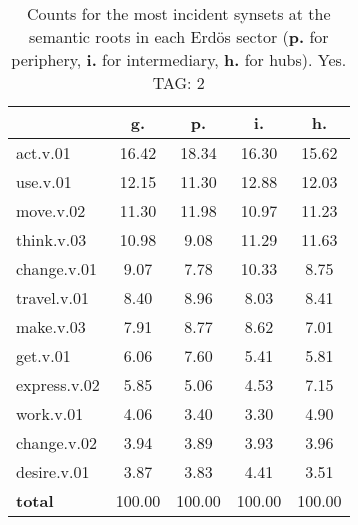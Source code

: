 \begin{table}[h!]
\begin{center}
\begin{tabular}{| l | c | c | c | c |}\hline
 & g. & p. & i. & h. \\\hline
act.v.01 & 16.42  & 18.34  & 16.30  & 15.62 \\\hline
use.v.01 & 12.15  & 11.30  & 12.88  & 12.03 \\\hline
move.v.02 & 11.30  & 11.98  & 10.97  & 11.23 \\\hline
think.v.03 & 10.98  & 9.08  & 11.29  & 11.63 \\\hline
change.v.01 & 9.07  & 7.78  & 10.33  & 8.75 \\\hline
travel.v.01 & 8.40  & 8.96  & 8.03  & 8.41 \\\hline
make.v.03 & 7.91  & 8.77  & 8.62  & 7.01 \\\hline
get.v.01 & 6.06  & 7.60  & 5.41  & 5.81 \\\hline
express.v.02 & 5.85  & 5.06  & 4.53  & 7.15 \\\hline
work.v.01 & 4.06  & 3.40  & 3.30  & 4.90 \\\hline
change.v.02 & 3.94  & 3.89  & 3.93  & 3.96 \\\hline
desire.v.01 & 3.87  & 3.83  & 4.41  & 3.51 \\\hline
{{\bf total}} & 100.00  & 100.00  & 100.00  & 100.00 \\\hline
\end{tabular}
\caption{Counts for the most incident synsets at the semantic roots in each Erd\"os sector ({\bf p.} for periphery, {\bf i.} for intermediary, {\bf h.} for hubs). Yes. TAG: 2}
\end{center}
\end{table}